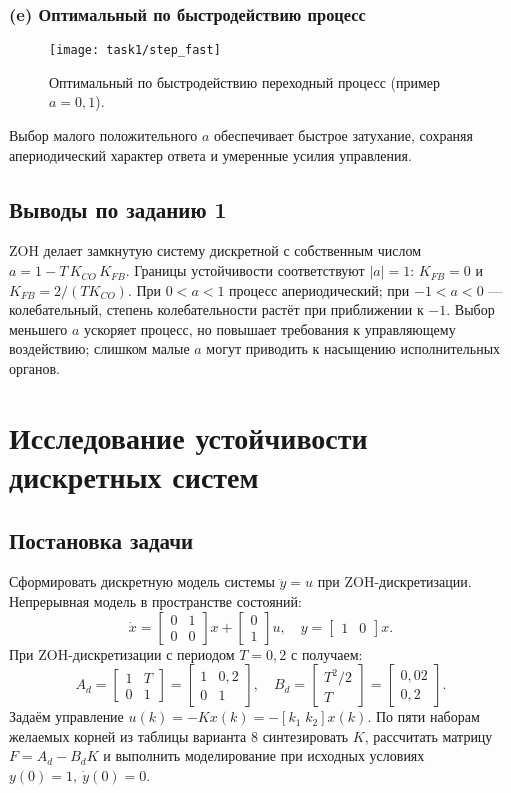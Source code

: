 \subsection*{(e) Оптимальный по быстродействию процесс}
\begin{figure}[H]
  \centering
  \texttt{[image: task1/step\_fast]}
  \caption{Оптимальный по быстродействию переходный процесс (пример \(a=0{,}1\)).}
  \label{fig:task1_fast}
\end{figure}
Выбор малого положительного \(a\) обеспечивает быстрое затухание, сохраняя апериодический характер ответа и умеренные усилия управления.

\section{Выводы по заданию 1}
ZOH делает замкнутую систему дискретной с собственным числом \(a=1-T\,K_{CO}\,K_{FB}\). Границы устойчивости соответствуют \(|a|=1\): \(K_{FB}=0\) и \(K_{FB}=2/(T K_{CO})\). При \(0<a<1\) процесс апериодический; при \(-1<a<0\) — колебательный, степень колебательности растёт при приближении к \(-1\). Выбор меньшего \(a\) ускоряет процесс, но повышает требования к управляющему воздействию; слишком малые \(a\) могут приводить к насыщению исполнительных органов.

\chapter{Исследование устойчивости дискретных систем}
\section{Постановка задачи}
Сформировать дискретную модель системы \(\ddot{y} = u\) при ZOH-дискретизации. Непрерывная модель в пространстве состояний:
\[
  \dot{x} = \begin{bmatrix} 0 & 1 \\ 0 & 0 \end{bmatrix} x + \begin{bmatrix} 0 \\ 1 \end{bmatrix} u, \quad y = \begin{bmatrix} 1 & 0 \end{bmatrix} x.
\]
При ZOH-дискретизации с периодом \(T = 0{,}2\) с получаем:
\[
  A_d = \begin{bmatrix} 1 & T \\ 0 & 1 \end{bmatrix} = \begin{bmatrix} 1 & 0{,}2 \\ 0 & 1 \end{bmatrix}, \quad B_d = \begin{bmatrix} T^2/2 \\ T \end{bmatrix} = \begin{bmatrix} 0{,}02 \\ 0{,}2 \end{bmatrix}.
\]
Задаём управление \(u(k) = -Kx(k) = -[k_1\;k_2]x(k)\). По пяти наборам желаемых корней из таблицы варианта 8 синтезировать \(K\), рассчитать матрицу \(F=A_d-B_dK\) и выполнить моделирование при исходных условиях \(y(0)=1,\ \dot{y}(0)=0\).

